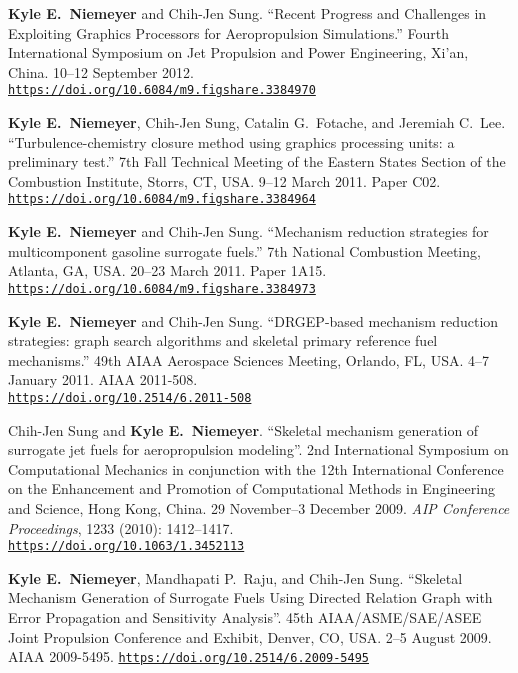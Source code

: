 \documentclass[margin,line,11pt]{res}
\makeatletter
\newlength{\bibhang}
\newlength{\bibsep}
 {\@listi \global\bibsep\itemsep \global\advance\bibsep by\parsep}
\newenvironment{bibenum*}
  {\renewcommand\labelenumi{\theenumi.}%
   \etaremune[
     topsep=0pt,
     itemsep=\bibsep,
     parsep=0pt,partopsep=0pt,
     itemindent=-\bibhang,
     leftmargin={\bibhang+\widthof{[999]}}]}
  {\endetaremune}
\newcommand*{\doi}[1]{\href{https://doi.org/#1}{\nolinkurl{https://doi.org/#1}}}
\makeatother
\begin{document}
\begin{resume}
\begin{bibenum*}
\item \textbf{Kyle E.~Niemeyer} and Chih-Jen Sung.
``Recent Progress and Challenges in Exploiting Graphics Processors for Aeropropulsion Simulations.''
Fourth International Symposium on Jet Propulsion and Power Engineering, Xi'an, China.
10--12 September 2012. \\
\doi{10.6084/m9.figshare.3384970}

\item \textbf{Kyle E.~Niemeyer}, Chih-Jen Sung, Catalin G.\ Fotache, and Jeremiah C.\ Lee.
``Turbulence-chemistry closure method using graphics processing units: a preliminary test.''
7th Fall Technical Meeting of the Eastern States Section of the Combustion Institute, Storrs, CT, USA.
9--12 March 2011.
Paper C02.
\doi{10.6084/m9.figshare.3384964}

\item \textbf{Kyle E.~Niemeyer} and Chih-Jen Sung.
``Mechanism reduction strategies for multicomponent gasoline surrogate fuels.''
7th National Combustion Meeting, Atlanta, GA, USA.
20--23 March 2011.
Paper 1A15.
\doi{10.6084/m9.figshare.3384973}

\item \textbf{Kyle E.~Niemeyer} and Chih-Jen Sung.
``DRGEP-based mechanism reduction strategies: graph search algorithms and skeletal primary reference fuel mechanisms.''
49th AIAA Aero\-space Sciences Meeting, Orlando, FL, USA.
4--7 January 2011.
AIAA 2011-508. \\
\doi{10.2514/6.2011-508}

\item Chih-Jen Sung and \textbf{Kyle E.~Niemeyer}.
``Skeletal mechanism generation of surrogate jet fuels for aeropropulsion modeling''.
2nd International Symposium on Computational Mechanics in conjunction with the 12th International Conference on the Enhancement and Promotion of Computational Methods in Engineering and Science, Hong Kong, China.
29 November--3 December 2009.
\emph{AIP Conference Proceedings}, 1233 (2010): 1412--1417. \\
\doi{10.1063/1.3452113}


\item \textbf{Kyle E.~Niemeyer}, Mandhapati P.\ Raju, and Chih-Jen Sung.
``Skeletal Mechanism Generation of Surrogate Fuels Using Directed Relation Graph with Error Propagation and Sensitivity Analysis''.
45th AIAA\slash ASME\slash SAE\slash ASEE Joint Propulsion Conference and Exhibit, Denver, CO, USA.
2--5 August 2009.
AIAA 2009-5495.
\doi{10.2514/6.2009-5495}


\end{bibenum*}
\end{resume}
\end{document}
